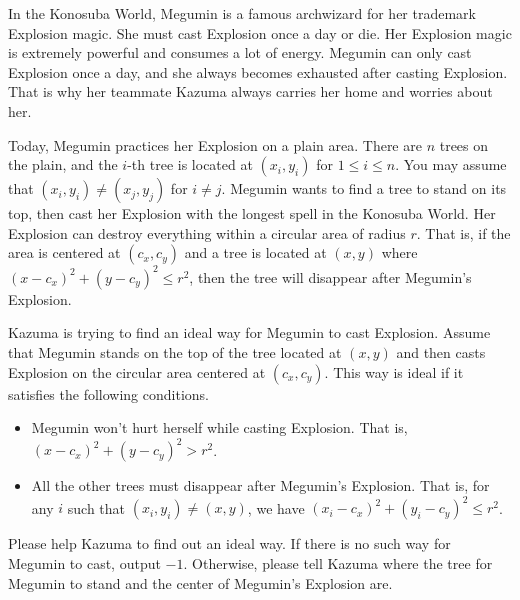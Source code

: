 In the Konosuba World, 
Megumin is a famous archwizard for her trademark Explosion magic.
She must cast Explosion once a day or die.
Her Explosion magic is extremely powerful and consumes a lot of energy.
Megumin can only cast Explosion once a day, 
and she always becomes exhausted after casting Explosion.
That is why her teammate Kazuma always carries her home and worries about her.

Today, Megumin practices her Explosion on a plain area. 
There are $n$ trees on the plain, 
and the $i$-th tree is located at $(x_i,y_i)$ for $1\le i \le n$.
You may assume that $(x_i,y_i)\neq(x_j,y_j)$ for $i\neq j$.
Megumin wants to find a tree to stand on its top, 
then cast her Explosion with the longest spell in the Konosuba World.
Her Explosion can destroy everything within a circular area of radius $r$.
That is, if the area is centered at $(c_x,c_y)$
and a tree is located at $(x,y)$ where $(x-c_x)^2+(y-c_y)^2\le r^2$,
then the tree will disappear after Megumin's Explosion.

Kazuma is trying to find an ideal way for Megumin to cast Explosion.
Assume that Megumin stands on the top of the tree located at $(x,y)$
and then casts Explosion on the circular area centered at $(c_x,c_y)$.
This way is ideal if it satisfies the following conditions.
\begin{itemize}
\item Megumin won't hurt herself while casting Explosion. That is, 
      $(x-c_x)^2+(y-c_y)^2 > r^2$.
\item All the other trees must disappear after Megumin's Explosion.
      That is, for any $i$ such that $(x_i,y_i)\neq (x,y)$, 
      we have $(x_i-c_x)^2+(y_i-c_y)^2\le r^2$.
\end{itemize}

Please help Kazuma to find out an ideal way. 
If there is no such way for Megumin to cast, output $-1$.
Otherwise, please tell Kazuma where the tree for Megumin to stand 
and the center of Megumin's Explosion are.
